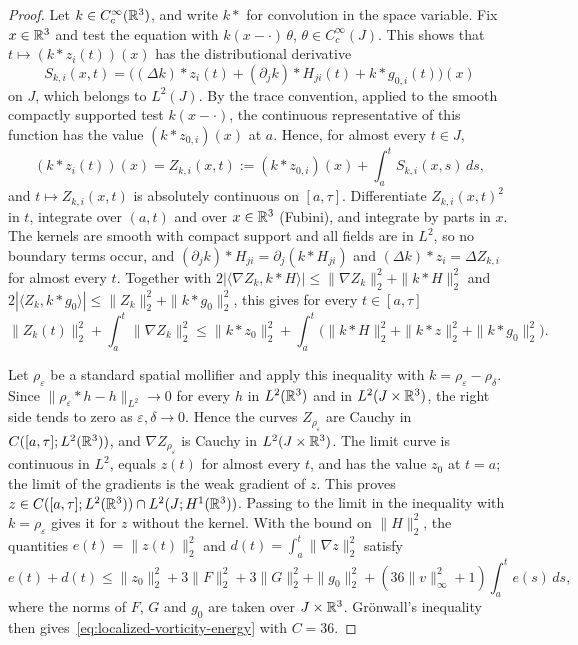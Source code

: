 \documentclass[11pt,letterpaper]{article}
\numberwithin{equation}{section}
\theoremstyle{plain}
\theoremstyle{definition}
\theoremstyle{remark}
\begin{document}
\begin{proof}
Let $k\in C_c^\infty(\mathbb{R}^3)$, and write $k\ast$ for convolution in the space variable. Fix $x\in\mathbb{R}^3$ and test the equation with $k(x-\cdot)\,\theta$, $\theta\in C_c^\infty(J)$. This shows that $t\mapsto(k\ast z_i(t))(x)$ has the distributional derivative
\[
 S_{k,i}(x,t)=\bigl((\Delta k)\ast z_i(t)+(\partial_jk)\ast H_{ji}(t)+k\ast g_{0,i}(t)\bigr)(x)
\]
on $J$, which belongs to $L^2(J)$. By the trace convention, applied to the smooth compactly supported test $k(x-\cdot)$, the continuous representative of this function has the value $(k\ast z_{0,i})(x)$ at $a$. Hence, for almost every $t\in J$,
\[
 (k\ast z_i(t))(x)=Z_{k,i}(x,t):=(k\ast z_{0,i})(x)+\int_a^tS_{k,i}(x,s)\,ds,
\]
and $t\mapsto Z_{k,i}(x,t)$ is absolutely continuous on $[a,\tau]$. Differentiate $Z_{k,i}(x,t)^2$ in $t$, integrate over $(a,t)$ and over $x\in\mathbb{R}^3$ (Fubini), and integrate by parts in $x$. The kernels are smooth with compact support and all fields are in $L^2$, so no boundary terms occur, and $(\partial_jk)\ast H_{ji}=\partial_j(k\ast H_{ji})$ and $(\Delta k)\ast z_i=\Delta Z_{k,i}$ for almost every $t$. Together with $2|\langle\nabla Z_k,k\ast H\rangle|\le\|\nabla Z_k\|_2^2+\|k\ast H\|_2^2$ and $2|\langle Z_k,k\ast g_0\rangle|\le\|Z_k\|_2^2+\|k\ast g_0\|_2^2$, this gives for every $t\in[a,\tau]$
\begin{equation*}
 \|Z_k(t)\|_2^2+\int_a^t\|\nabla Z_k\|_2^2
 \le\|k\ast z_0\|_2^2+\int_a^t\bigl(\|k\ast H\|_2^2+\|k\ast z\|_2^2+\|k\ast g_0\|_2^2\bigr).
\end{equation*}

Let $\rho_\varepsilon$ be a standard spatial mollifier and apply this inequality with $k=\rho_\varepsilon-\rho_\delta$. Since $\|\rho_\varepsilon\ast h-h\|_{L^2}\to0$ for every $h$ in $L^2(\mathbb{R}^3)$ and in $L^2(J\times\mathbb{R}^3)$, the right side tends to zero as $\varepsilon,\delta\to0$. Hence the curves $Z_{\rho_\varepsilon}$ are Cauchy in $C([a,\tau];L^2(\mathbb{R}^3))$, and $\nabla Z_{\rho_\varepsilon}$ is Cauchy in $L^2(J\times\mathbb{R}^3)$. The limit curve is continuous in $L^2$, equals $z(t)$ for almost every $t$, and has the value $z_0$ at $t=a$; the limit of the gradients is the weak gradient of $z$. This proves $z\in C([a,\tau];L^2(\mathbb{R}^3))\cap L^2(J;H^1(\mathbb{R}^3))$. Passing to the limit in the inequality with $k=\rho_\varepsilon$ gives it for $z$ without the kernel. With the bound on $\|H\|_2^2$, the quantities $e(t)=\|z(t)\|_2^2$ and $d(t)=\int_a^t\|\nabla z\|_2^2$ satisfy
\[
 e(t)+d(t)\le\|z_0\|_2^2+3\|F\|_2^2+3\|G\|_2^2+\|g_0\|_2^2+(36\|v\|_\infty^2+1)\int_a^te(s)\,ds,
\]
where the norms of $F$, $G$ and $g_0$ are taken over $J\times\mathbb{R}^3$. Grönwall's inequality then gives~\eqref{eq:localized-vorticity-energy} with $C=36$.
\end{proof}
\end{document}

